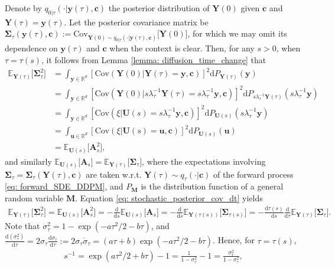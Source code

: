 \documentclass[11pt]{article}
\newcommand{\mE}{\mathbb{E}}
\newcommand{\mR}{\mathbb{R}}
\newcommand{\bY}{\mathbf{Y}}
\newcommand{\bu}{\mathbf{u}}
\newcommand{\by}{\mathbf{y}}
\newcommand{\bc}{\mathbf{c}}
\newcommand{\bM}{\mathbf{M}}
\newcommand{\bA}{\mathbf{A}}
\newcommand{\bSimga}{\boldsymbol{\Sigma}}
\newcommand{\bU}{\mathbf{U}}
\newcommand{\cov}{{\text{Cov}}}
\newcommand{\intd}{\mathrm{d}}
\begin{document}
Denote by $q_{0|\tau}(\cdot | \by(\tau), \bc)$ the posterior distribution of $\bY(0)$ given $\bc$ and $\bY(\tau)=\by(\tau)$. Let the posterior covariance matrix be $\bSimga_\tau(\by(\tau), \bc) := \cov_{\bY(0)\sim q_{0|\tau}(\cdot | \by(\tau), \bc)}\big[\bY(0)\big]$, for which we may omit its dependence on $\by(\tau)$ and $\bc$ when the context is clear. Then, for any $s > 0$, when $\tau = \tau(s)$, it follows from Lemma \ref{lemma: diffusion_time_change} that
\begin{align*}
    \mE_{\bY(\tau)}\big[\bSimga_{\tau}^2\big] &= \int_{\by\in\mR^d} [\cov(\bY(0) | \bY(\tau) = \by, \bc)]^2 \intd P_{\bY(\tau)}(\by)\\
    &= \int_{\by\in\mR^d} [\cov(\bY(0) | s\lambda_\tau^{-1}\bY(\tau) = s\lambda_\tau^{-1}\by, \bc)]^2 \intd P_{s\lambda_\tau^{-1}\bY(\tau)}(s\lambda_\tau^{-1}\by)\\
    & = \int_{\by\in\mR^d} [\cov(\xi | \bU(s) = s\lambda_\tau^{-1}\by, \bc)]^2 \intd P_{\bU(s)}(s\lambda_\tau^{-1}\by)\\
    &=\int_{\bu\in\mR^d} [\cov(\xi | \bU(s) = \bu, \bc)]^2 \intd P_{\bU(s)}(\bu)\\
    &= \mE_{\bU(s)}\big[\bA_s^2\big],
\end{align*}
and similarly $\mE_{\bU(s)}\big[\bA_s\big] = \mE_{\bY(\tau)}\big[\bSimga_{\tau}\big]$, where the expectations involving  $\bSimga_{\tau} = \bSimga_{\tau}(\bY(\tau), \bc)$ are taken w.r.t. $\bY(\tau)\sim q_\tau(\cdot | \bc)$ of the forward process \eqref{eq: forward_SDE_DDPM}, and $P_{\bM}$ is the distribution function of a general random variable $\bM$.
Equation \eqref{eq: stochastic_posterior_cov_dt} yields
\begin{align}\label{eq: posterior_cov_dt}
    \mE_{\bY(\tau)}\big[\bSimga_{\tau}^2\big] = \mE_{\bU(s)}\big[\bA_s^2\big] = -\frac{\intd}{\intd s}\mE_{\bU(s)}\big[\bA_s\big] = -\frac{\intd}{\intd s}\mE_{\bY(\tau(s))}\big[\bSimga_{\tau(s)}\big] = -\frac{\intd \tau(s)}{\intd s}\frac{\intd}{\intd \tau}\mE_{\bY(\tau)}\big[\bSimga_{\tau}\big].
\end{align}
Note that $\sigma_\tau^2 = 1 - \exp(-a\tau^2/2 - b\tau)$, and $\frac{\intd(\sigma_\tau^2)}{\intd \tau} = 2\sigma_\tau \frac{\intd \sigma_\tau}{\intd \tau} := 2\sigma_\tau\dot{\sigma}_\tau = (a\tau + b)\exp(-a\tau^2/2 - b\tau)$. Hence,  for $\tau = \tau(s)$,
\begin{align*}
    s^{-1} = \exp(a\tau^2/2 + b\tau) - 1 = \frac{1}{1 - \sigma_\tau^2} - 1 = \frac{\sigma_\tau^2}{1 - \sigma_\tau^2},
\end{align*}
\end{document}
